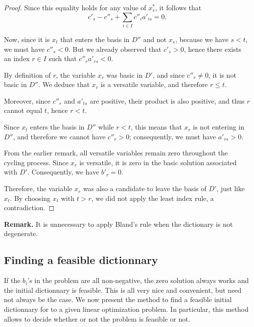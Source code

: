 \begin{proof}
    Since this equality holds for any value of $x^*_s$, it follows that
    \[
    c'_s - c''_s + \sum_{i \in I} c''_i a'_{is} = 0 .
    \]

    Now, since it is $x_t$ that enters the basis in $D''$ and not $x_s$, because we have $s < t$, we must have $c''_s < 0$. But we already observed that $c'_s > 0$, hence there exists an index $r \in I$ such that $c''_r a'_{rs} < 0$.

    By definition of $r$, the variable $x_r$ was basic in $D'$, and since $c''_r \neq 0$, it is not basic in $D''$. We deduce that $x_r$ is a versatile variable, and therefore $r \leqslant t$.

    Moreover, since $c''_r$ and $a'_{ts}$ are positive, their product is also positive, and thus $r$ cannot equal $t$, hence $r < t$.

    Since $x_t$ enters the basis in $D''$ while $r < t$, this means that $x_r$ is not entering in $D''$, and therefore we cannot have $c''_r > 0$; consequently, we must have $a'_{rs} > 0$.

    From the earlier remark, all versatile variables remain zero throughout the cycling process. Since $x_r$ is versatile, it is zero in the basic solution associated with $D'$. Consequently, we have $b'_r = 0$.

    Therefore, the variable $x_r$ was also a candidate to leave the basis of $D'$, just like $x_t$. By choosing $x_t$ with $t > r$, we did not apply the least index rule, a contradiction.
\end{proof}

\textbf{Remark.} It is unnecessary to apply Bland's rule when the dictionary is not degenerate.

\subsection{Finding a feasible dictionnary}

If the $ b_i $'s in the problem are all non-negative, the zero solution always works and the initial dictionnary is feasible. This is all very nice and convenient, but need not always be the case. We now present the method to find a feasible initial dictionnary for to a given linear optimization problem. In particular, this method allows to decide whether or not the problem is feasible or not. 

